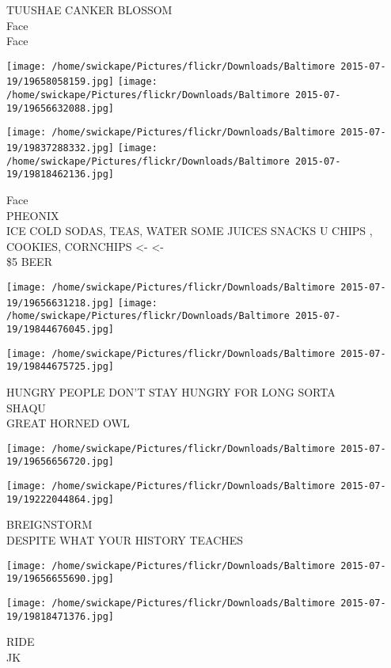 \documentclass[10pt,letterpaper]{article}
\begin{document}
TUUSHAE CANKER BLOSSOM\\
Face\\
Face
\pagebreak

\texttt{[image: /home/swickape/Pictures/flickr/Downloads/Baltimore 2015-07-19/19658058159.jpg]}
\texttt{[image: /home/swickape/Pictures/flickr/Downloads/Baltimore 2015-07-19/19656632088.jpg]}

\texttt{[image: /home/swickape/Pictures/flickr/Downloads/Baltimore 2015-07-19/19837288332.jpg]}
\texttt{[image: /home/swickape/Pictures/flickr/Downloads/Baltimore 2015-07-19/19818462136.jpg]}

Face\\
PHEONIX\\
ICE COLD SODAS, TEAS, WATER SOME JUICES SNACKS U CHIPS , COOKIES, CORNCHIPS <{-} <{-}\\
\$5 BEER
\pagebreak

\texttt{[image: /home/swickape/Pictures/flickr/Downloads/Baltimore 2015-07-19/19656631218.jpg]}
\texttt{[image: /home/swickape/Pictures/flickr/Downloads/Baltimore 2015-07-19/19844676045.jpg]}

\vspace{0.25in}
\texttt{[image: /home/swickape/Pictures/flickr/Downloads/Baltimore 2015-07-19/19844675725.jpg]}

HUNGRY PEOPLE DON'T STAY HUNGRY FOR LONG SORTA\\
SHAQU\\
GREAT HORNED OWL
\pagebreak

\texttt{[image: /home/swickape/Pictures/flickr/Downloads/Baltimore 2015-07-19/19656656720.jpg]}

\vspace{0.25in}
\texttt{[image: /home/swickape/Pictures/flickr/Downloads/Baltimore 2015-07-19/19222044864.jpg]}

BREIGNSTORM\\
DESPITE WHAT YOUR HISTORY TEACHES
\pagebreak

\texttt{[image: /home/swickape/Pictures/flickr/Downloads/Baltimore 2015-07-19/19656655690.jpg]}

\vspace{0.25in}
\texttt{[image: /home/swickape/Pictures/flickr/Downloads/Baltimore 2015-07-19/19818471376.jpg]}

RIDE\\
JK
\pagebreak
\end{document}

